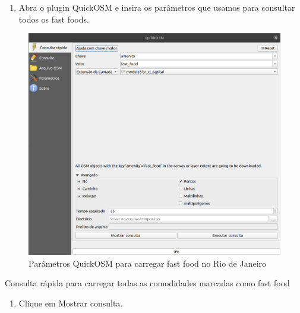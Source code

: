 \documentclass[
  portuguese,
]{krantz}
\providecommand{\tightlist}{%
  \setlength{\itemsep}{0pt}\setlength{\parskip}{0pt}}
\begin{document}
\begin{enumerate}
\def\labelenumi{\arabic{enumi}.}
\tightlist
\item
  Abra o plugin QuickOSM e insira os parâmetros que usamos para consultar todos os fast foods.
\end{enumerate}

\begin{figure}
\centering
\includegraphics{media/modulo3/quickosm-6.png}
\caption{Parâmetros QuickOSM para carregar fast food no Rio de Janeiro}
\end{figure}

Consulta rápida para carregar todas as comodidades marcadas como fast food

\begin{enumerate}
\def\labelenumi{\arabic{enumi}.}
\setcounter{enumi}{1}
\tightlist
\item
  Clique em Mostrar consulta.
\end{enumerate}
\end{document}
